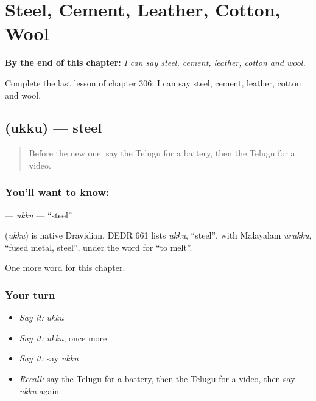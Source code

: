 
\chapter{Steel, Cement, Leather, Cotton, Wool}
\label{ch:te-steel-cement-leather-cotton-wool}

\begin{chapteropening}
\textbf{By the end of this chapter:} \emph{I can say steel, cement, leather, cotton and wool.}

Complete the last lesson of chapter 306: I can say steel, cement, leather, cotton and wool.
\end{chapteropening}

\section[\texorpdfstring{\te{ఉక్కు} (ukku)}{ఉక్కు (ukku)}]{ (ukku) — steel}

\label{lesson:TE-C306-ukku}



\begin{quote}
Before the new one: say the Telugu for a battery, then the Telugu for a video.
\end{quote}

\subsection*{You'll want to know: }
\textbf{} — \emph{ukku} — \textquotedblleft{}steel\textquotedblright{}.

\begin{cousinweb}
\textbf{} (\emph{ukku}) is native Dravidian. DEDR 661 lists \emph{ukku}, \textquotedblleft{}steel\textquotedblright{}, with Malayalam \emph{urukku}, \textquotedblleft{}fused metal, steel\textquotedblright{}, under the word for \textquotedblleft{}to melt\textquotedblright{}.
\end{cousinweb}

\begin{grammarlens}[title={What you've built}]
One more word for this chapter.
\end{grammarlens}

\subsection*{Your turn}
\begin{itemize}
\raggedright
  \item \emph{Say it:} \emph{ukku}
  \item \emph{Say it:} \emph{ukku}, once more
  \item \emph{Say it:} say \emph{ukku}
  \item \emph{Recall:} say the Telugu for a battery, then the Telugu for a video, then say \emph{ukku} again
\end{itemize}

